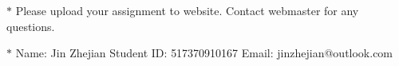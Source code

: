 \documentclass[12pt,a4paper]{article}
\theoremstyle{definition}
\begin{document}
\noindent

\noindent{}
\begin{center}
\footnotesize{\color{red}$*$ Please upload your assignment to website. Contact webmaster for any questions.}

\footnotesize{\color{blue}$*$ Name: Jin Zhejian  \quad Student ID: {517370910167} \quad Email: jinzhejian@outlook.com}
\end{center}
\end{document}
